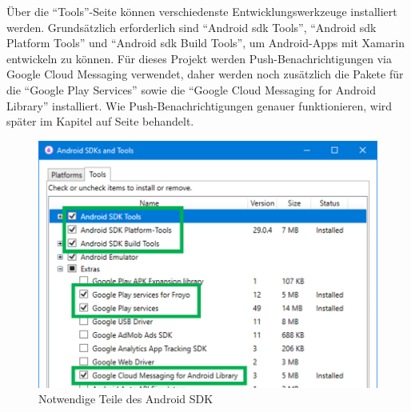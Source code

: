 Über die \enquote{Tools}-Seite können verschiedenste Entwicklungswerkzeuge installiert werden.
Grundsätzlich erforderlich sind \enquote{Android \ac{sdk} Tools}, \enquote{Android \ac{sdk} Platform Tools} und \enquote{Android \ac{sdk} Build Tools}, um Android-Apps mit Xamarin entwickeln zu können.
Für dieses Projekt werden Push-Benachrichtigungen via Google Cloud Messaging verwendet, daher werden noch zusätzlich die Pakete für die \enquote{Google Play Services} sowie die \enquote{Google Cloud Messaging for Android Library} installiert.
Wie Push-Benachrichtigungen genauer funktionieren, wird später im Kapitel  auf Seite \pageref{ch:push} behandelt.
\begin{figure}[H]
    \centering\includegraphics[width=0.8\linewidth]{images/auswahl_rahmenwerk/android_sdk_auswahl.png}    
    \caption{Notwendige Teile des Android SDK}
\end{figure}

